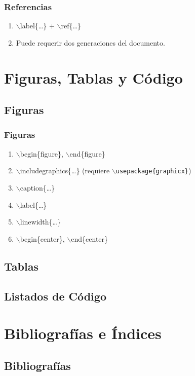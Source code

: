 \documentclass[a4paper,slidestop,xcolor=pst,dvips,blue]{beamer}
\newcommand{\command}[1]{$\backslash$#1\{\dots\}}
\newcommand{\envCommand}[1]{$\backslash$begin\{#1\}, $\backslash$end\{#1\}}
\begin{document}
\begin{frame}[c]
    \frametitle{Referencias}
    \begin{enumerate}
        \item \command{label} + \command{ref}
        \item Puede requerir dos generaciones del documento. 
    \end{enumerate}
\end{frame}

\section{Figuras, Tablas y Código}

\subsection{Figuras}

\begin{frame}[c]
    \frametitle{Figuras}
    \begin{enumerate}[<+->]
        \item \envCommand{figure} 
        \item \command{includegraphics} (requiere \texttt{$\backslash$usepackage\{graphicx\}})
        \item \command{caption}
        \item \command{label}
        \item \command{linewidth}
        \item \envCommand{center} 
    \end{enumerate}
\end{frame}

\subsection{Tablas}

\subsection{Listados de Código}

\section{Bibliografías e Índices}

\subsection{Bibliografías}
\end{document}
